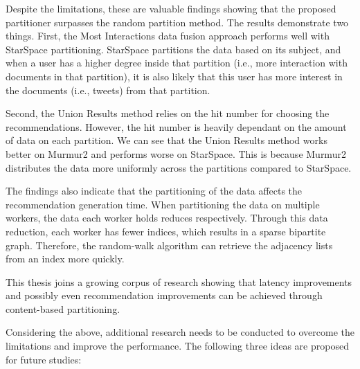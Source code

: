 Despite the limitations, these are valuable findings showing that the proposed partitioner surpasses the random partition method. The results demonstrate two things. First, the Most Interactions data fusion approach performs well with StarSpace partitioning. StarSpace partitions the data based on its subject, and when a user has a higher degree inside that partition (i.e., more interaction with documents in that partition), it is also likely that this user has more interest in the documents (i.e., tweets) from that partition. 


Second, the Union Results method relies on the hit number for choosing the recommendations. However, the hit number is heavily dependant on the amount of data on each partition. We can see that the Union Results method works better on Murmur2 and performs worse on StarSpace. This is because Murmur2 distributes the data more uniformly across the partitions compared to StarSpace.


The findings also indicate that the partitioning of the data affects the recommendation generation time. When partitioning the data on multiple workers, the data each worker holds reduces respectively. Through this data reduction, each worker has fewer indices, which results in a sparse bipartite graph. Therefore, the random-walk algorithm can retrieve the adjacency lists from an index more quickly.


This thesis joins a growing corpus of research showing that latency improvements and possibly even recommendation improvements can be achieved through content-based partitioning.


Considering the above, additional research needs to be conducted to overcome the limitations and improve the performance. The following three ideas are proposed for future studies:

